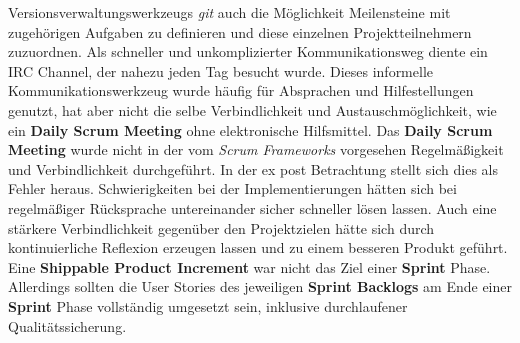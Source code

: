 Versionsverwaltungswerkzeugs \textit{git} auch die Möglichkeit Meilensteine mit zugehörigen Aufgaben zu definieren und diese einzelnen
Projektteilnehmern zuzuordnen.  Als schneller und unkomplizierter Kommunikationsweg diente ein IRC Channel, der nahezu jeden Tag besucht wurde. Dieses informelle Kommunikationswerkzeug wurde häufig für Absprachen und Hilfestellungen genutzt, hat aber nicht die selbe Verbindlichkeit und Austauschmöglichkeit, wie ein \textbf{Daily Scrum Meeting} ohne elektronische Hilfsmittel. Das \textbf{Daily Scrum Meeting} wurde nicht in der vom \textit{Scrum Frameworks} vorgesehen Regelmäßigkeit und Verbindlichkeit durchgeführt. In der ex post Betrachtung stellt sich dies als Fehler heraus. Schwierigkeiten bei der Implementierungen hätten sich
bei regelmäßiger Rücksprache untereinander sicher schneller lösen lassen. Auch eine stärkere Verbindlichkeit gegenüber den Projektzielen hätte sich
durch kontinuierliche Reflexion erzeugen lassen und zu einem besseren Produkt geführt.\\
Eine \textbf{Shippable Product Increment} war nicht das Ziel
einer \textbf{Sprint} Phase. Allerdings sollten die User Stories des jeweiligen \textbf{Sprint Backlogs} am Ende einer \textbf{Sprint} Phase
vollständig umgesetzt sein, inklusive durchlaufener Qualitätssicherung.  
